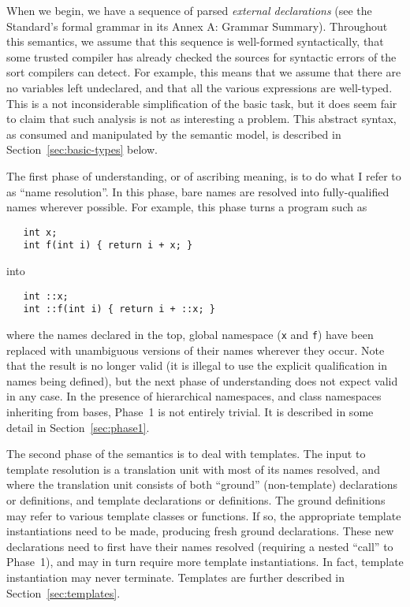 \documentclass[11pt]{article}
\begin{document}
When we begin, we have a sequence of parsed \emph{external
  declarations} (see the Standard's formal grammar in its Annex A:
Grammar Summary).  Throughout this semantics, we assume that this
sequence is well-formed syntactically, that some trusted compiler has
already checked the sources for syntactic errors of the sort compilers
can detect.  For example, this means that we assume that there are no
variables left undeclared, and that all the various expressions are
well-typed.  This is a not inconsiderable simplification of the basic
task, but it does seem fair to claim that such analysis is not as
interesting a problem.  This abstract syntax, as consumed and
manipulated by the semantic model, is described in
Section~\ref{sec:basic-types} below.

The first phase of understanding, or of ascribing meaning, is to do
what I refer to as ``name resolution''.  In this phase, bare names are
resolved into fully-qualified names wherever possible.  For example,
this phase turns a program such as
\begin{verbatim}
   int x;
   int f(int i) { return i + x; }
\end{verbatim}
into
\begin{verbatim}
   int ::x;
   int ::f(int i) { return i + ::x; }
\end{verbatim}
where the names declared in the top, global namespace (\texttt{x} and
\texttt{f}) have been replaced with unambiguous versions of their
names wherever they occur.  Note that the result is no longer valid
\cpp{} (it is illegal to use the explicit qualification in names being
defined), but the next phase of understanding does not expect valid
\cpp{} in any case.  In the presence of hierarchical namespaces, and
class namespaces inheriting from bases, Phase~1 is not entirely
trivial.  It is described in some detail in Section~\ref{sec:phase1}.

The second phase of the semantics is to deal with templates.  The
input to template resolution is a translation unit with most of its
names resolved, and where the translation unit consists of both
``ground'' (non-template) declarations or definitions, and template
declarations or definitions.  The ground definitions may refer to
various template classes or functions.  If so, the appropriate
template instantiations need to be made, producing fresh ground
declarations.  These new declarations need to first have their names
resolved (requiring a nested ``call'' to Phase~1), and may in turn
require more template instantiations.  In fact, template instantiation
may never terminate.  Templates are further described in
Section~\ref{sec:templates}.
\end{document}
